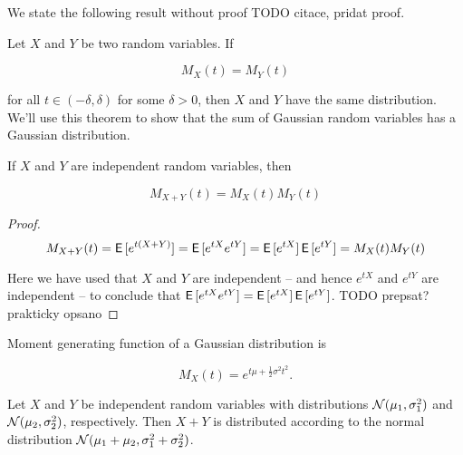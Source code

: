 We state the following result without proof {TODO citace, pridat proof}.

\begin{thm}
  Let $X$ and $Y$ be two random variables. If

  \begin{equation}
    M_X(t) = M_Y(t)
  \end{equation}

  for all $t \in (-\delta, \delta)$ for some $\delta > 0$, then $X$ and $Y$
  have the same distribution. We'll use this theorem to show that the sum of
  Gaussian random variables has a Gaussian distribution.
\end{thm}

\begin{thm}
  \citep{mitzenmacher2017probability}\label{thm:sum-independent-gaussian}
  If $X$ and $Y$ are independent random variables, then

  \begin{equation}
    M_{X + Y}(t) = M_X(t) M_Y(t)
  \end{equation}

  \begin{proof}
    \begin{equation}
      M_{X + Y}(t) = \operatorname{\textsf{E}\,}[e^{t(X + Y)}] = \operatorname{\textsf{E}\,}[e^{tX} e^{tY}] = \operatorname{\textsf{E}\,}[e^{tX}] \operatorname{\textsf{E}\,}[e^{tY}] = M_X(t) M_Y(t)
    \end{equation}

    Here we have used that $X$ and $Y$ are independent -- and hence
    $e^{tX}$ and $e^{tY}$ are independent -- to conclude that $\operatorname{\textsf{E}\,}[e^{tX}
    e^{tY}] = \operatorname{\textsf{E}\,}[e^{tX}] \operatorname{\textsf{E}\,}[e^{tY}]$. {TODO prepsat? prakticky opsano}
  \end{proof}
\end{thm}


\begin{thm}
  Moment generating function of a Gaussian distribution is

  \begin{equation}
    M_X(t) = e^{t \mu + \frac{1}{2}\sigma^2 t^2}.
  \end{equation}
\end{thm}

\begin{thm}
  Let $X$ and $Y$ be independent random variables with distributions
  ${\mathcal{N}}(\mu_1, \sigma_1^2)$ and ${\mathcal{N}}(\mu_2, \sigma_2^2)$, respectively. Then
  $X + Y$ is distributed according to the normal distribution ${\mathcal{N}}(\mu_1 +
  \mu_2, \sigma_1^2 + \sigma_2^2)$.

\end{thm}

